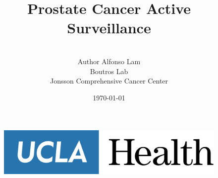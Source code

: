 \documentclass[]{article}
\title{\Huge Prostate Cancer Active Surveillance }
\date{\today}
\author{\\[1cm]
      Author Alfonso Lam\\[1.5cm]
      Boutros Lab\\
      Jonsson Comprehensive Cancer Center\\
      }
\begin{document}
\begin{titlingpage}
\maketitle
\begin{figure}
    \centering
    \includegraphics[scale=0.03]{uclalogo.png}
    \label{fig:my_label}
\end{figure}
\end{titlingpage}

%
% 
% 
% 
% 
% 
\end{document}
